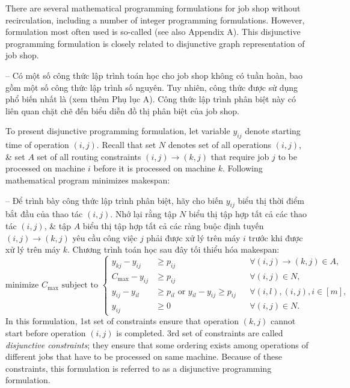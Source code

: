 \documentclass{article}
\begin{document}
\begin{itemize}
\begin{itemize}
        There are several mathematical programming formulations for job shop without recirculation, including a number of integer programming formulations. However, formulation most often used is so-called  (see also Appendix A). This disjunctive programming formulation is closely related to disjunctive graph representation of job shop.

        -- Có một số công thức lập trình toán học cho job shop không có tuần hoàn, bao gồm một số công thức lập trình số nguyên. Tuy nhiên, công thức được sử dụng phổ biến nhất là  (xem thêm Phụ lục A). Công thức lập trình phân biệt này có liên quan chặt chẽ đến biểu diễn đồ thị phân biệt của job shop.

        To present disjunctive programming formulation, let variable $y_{ij}$ denote starting time of operation $(i,j)$. Recall that set $N$ denotes set of all operations $(i,j)$, \& set $A$ set of all routing constraints $(i,j)\to(k,j)$ that require job $j$ to be processed on machine $i$ before it is processed on machine $k$. Following mathematical program minimizes makespan:

        -- Để trình bày công thức lập trình phân biệt, hãy cho biến $y_{ij}$ biểu thị thời điểm bắt đầu của thao tác $(i,j)$. Nhớ lại rằng tập $N$ biểu thị tập hợp tất cả các thao tác $(i,j)$, \& tập $A$ biểu thị tập hợp tất cả các ràng buộc định tuyến $(i,j)\to(k,j)$ yêu cầu công việc $j$ phải được xử lý trên máy $i$ trước khi được xử lý trên máy $k$. Chương trình toán học sau đây tối thiểu hóa makespan:
        \begin{equation*}
            \mbox{minimize } C_{\max}\mbox{ subject to }\left\{\begin{split}
                y_{kj} - y_{ij}&\ge p_{ij}&&\forall(i,j)\to(k,j)\in A,\\
                C_{\max} - y_{ij}&\ge p_{ij}&&\forall(i,j)\in N,\\
                y_{ij} - y_{il}&\ge p_{il}\mbox{ or } y_{il} - y_{ij}\ge p_{ij}&&\forall(i,l),(i,j),i\in[m],\\
                y_{ij}&\ge0&&\forall(i,j)\in N.
            \end{split}\right.
        \end{equation*}
        In this formulation, 1st set of constraints ensure that operation $(k,j)$ cannot start before operation $(i,j)$ is completed. 3rd set of constraints are called {\it disjunctive constraints}; they ensure that some ordering exists among operations of different jobs that have to be processed on same machine. Because of these constraints, this formulation is referred to as a disjunctive programming formulation.


\end{itemize}
\end{itemize}
\end{document}
